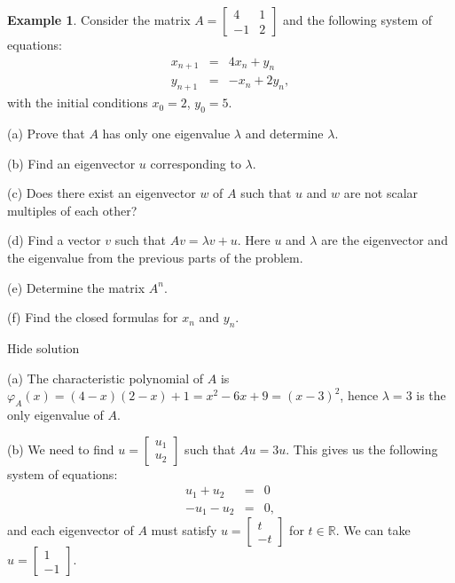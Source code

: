 \documentclass[11pt]{article}
\theoremstyle{definition}
\newtheorem{exmp}[thm]{Example}
\theoremstyle{plain}
\begin{document}
\begin{exmp}
Consider the matrix \( A=\left[\begin{array}{cc}4&1\\-1&2\end{array}\right]\) and the following system of equations: \begin{eqnarray*} x_{n+1}&=&4x_n+y_n\\ y_{n+1}&=&-x_n+2y_n, \end{eqnarray*} with the initial conditions \( x_0=2 \), \( y_0=5 \).

    (a) Prove that \( A \) has only one eigenvalue \( \lambda \) and determine \( \lambda \).

    (b) Find an eigenvector \( u \) corresponding to \( \lambda \).

    (c) Does there exist an eigenvector \( w \) of \( A \) such that \( u \) and \( w \) are not scalar multiples of each other?

    (d) Find a vector \( v \) such that \( Av=\lambda v+u \). Here \( u \) and \( \lambda \) are the eigenvector and the eigenvalue from the previous parts of the problem.

    (e) Determine the matrix \( A^n \).

    (f) Find the closed formulas for \( x_n \) and \( y_n \).
\end{exmp}

Hide solution

    (a) The characteristic polynomial of \( A \) is \( \varphi_A(x)=(4-x)(2-x)+1=x^2-6x+9=(x-3)^2 \), hence \( \lambda=3 \) is the only eigenvalue of \( A \).

    (b) We need to find \( u=\left[\begin{array}{c} u_1\\u_2\end{array}\right]\) such that \( Au=3u \). This gives us the following system of equations: \begin{eqnarray*} u_1+u_2&=&0\\ -u_1-u_2&=&0, \end{eqnarray*} and each eigenvector of \( A \) must satisfy \( u=\left[\begin{array}{c} t\\-t\end{array}\right]\) for \( t\in\mathbb R \). We can take \( u=\left[\begin{array}{c} 1\\-1\end{array}\right]\).
\end{document}
